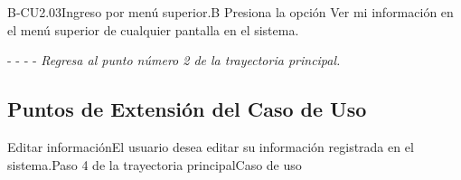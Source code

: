 	\begin{UCtrayectoriaA}{B-CU2.03}{Ingreso por menú superior.}{B}
	    \UCpaso[\UCactor]Presiona la opción Ver mi información en el menú superior de cualquier pantalla en el sistema. %
	    \item[- -] - - {\em Regresa al punto número 2 de la trayectoria principal.}
	\end{UCtrayectoriaA}
	
	\subsection{Puntos de Extensión del Caso de Uso}
	
	\begin{UCExtenssionPoint}{Editar información}{El usuario desea editar su información registrada en el sistema.}{Paso 4 de la trayectoria principal}{Caso de uso } 
	\end{UCExtenssionPoint}
	

